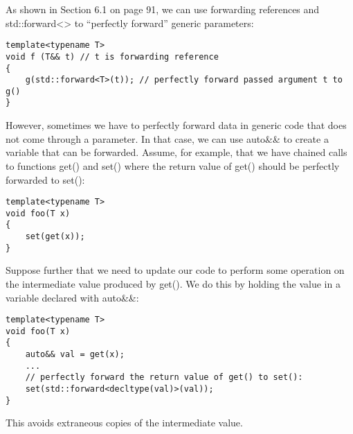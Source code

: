 As shown in Section 6.1 on page 91, we can use forwarding references and std::forward<> to “perfectly forward” generic parameters:

\begin{lstlisting}[style=styleCXX]
template<typename T>
void f (T&& t) // t is forwarding reference
{
	g(std::forward<T>(t)); // perfectly forward passed argument t to g()
}
\end{lstlisting}

However, sometimes we have to perfectly forward data in generic code that does not come through a parameter. In that case, we can use auto\&\& to create a variable that can be forwarded. Assume, for example, that we have chained calls to functions get() and set() where the return value of get() should be perfectly forwarded to set():

\begin{lstlisting}[style=styleCXX]
template<typename T>
void foo(T x)
{
	set(get(x));
}
\end{lstlisting}

Suppose further that we need to update our code to perform some operation on the intermediate value produced by get(). We do this by holding the value in a variable declared with auto\&\&:

\begin{lstlisting}[style=styleCXX]
template<typename T>
void foo(T x)
{
	auto&& val = get(x);
	...
	// perfectly forward the return value of get() to set():
	set(std::forward<decltype(val)>(val));
}
\end{lstlisting}

This avoids extraneous copies of the intermediate value.








































